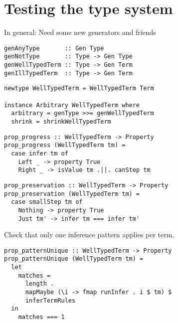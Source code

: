 \documentclass{beamer}
\begin{document}
\section{Testing the type system}

\begin{frame}[fragile]
  \begin{center}
    In general: Need some new generators and friends
  \end{center}
  \begin{verbatim}
genAnyType       :: Gen Type
genNotType       :: Type -> Gen Type
genWellTypedTerm :: Type -> Gen Term
genIllTypedTerm  :: Type -> Gen Term
  \end{verbatim}
\end{frame}

\begin{frame}[fragile]
  \begin{verbatim}
newtype WellTypedTerm = WellTypedTerm Term

instance Arbitrary WellTypedTerm where
  arbitrary = genType >>= genWellTypedTerm
  shrink = shrinkWellTypedTerm
  \end{verbatim}
\end{frame}

\begin{frame}[fragile]
  \begin{verbatim}
prop_progress :: WellTypedTerm -> Property
prop_progress (WellTypedTerm tm) =
  case infer tm of
    Left _ -> property True
    Right _ -> isValue tm .||. canStep tm
  \end{verbatim}
\end{frame} 

\begin{frame}[fragile]
  \begin{verbatim}
prop_preservation :: WellTypedTerm -> Property
prop_preservation (WellTypedTerm tm) =
  case smallStep tm of
    Nothing -> property True
    Just tm' -> infer tm === infer tm'
  \end{verbatim}
\end{frame} 

\begin{frame}[fragile]
  \begin{center}
   Check that only one inference pattern applies per term.
  \end{center}
  \begin{verbatim}
prop_patternUnique :: WellTypedTerm -> Property
prop_patternUnique (WellTypedTerm tm) =
  let
    matches =
      length .
      mapMaybe (\i -> fmap runInfer . i $ tm) $
      inferTermRules
  in
    matches === 1
  \end{verbatim}
\end{frame} 
\end{document}
